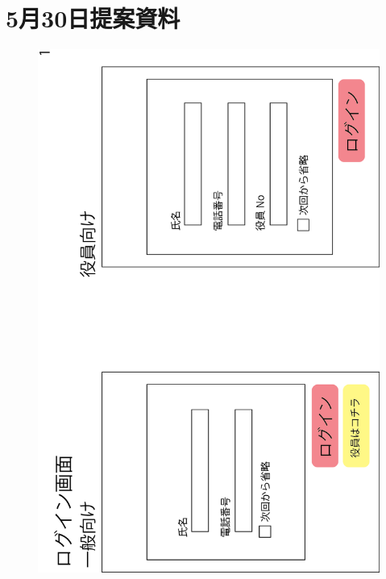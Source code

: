 \chapter{5月30日提案資料}
\begin{figure}[ht]
    \begin{center}
      \includegraphics[keepaspectratio, scale=0.7]{appendixs/appendixA_figres/fig1.png}
    \end{center}
\end{figure}

